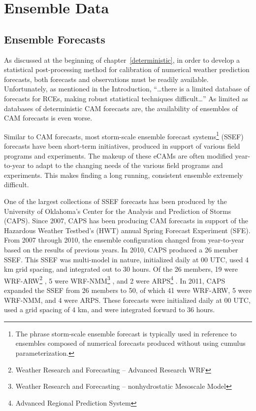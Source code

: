 

\section{Ensemble Data}
\label{edata}




\subsection{Ensemble Forecasts}
\label{emodel}

As discussed at the beginning of \mbox{chapter \ref{deterministic}}, in order to develop a statistical post-processing method for calibration of numerical weather prediction forecasts, both forecasts and observations must be readily available.
Unfortunately, as mentioned in the Introduction, ``\dots there is a limited database of forecasts for RCEs, making robust statistical techniques difficult\dots''
As limited as databases of deterministic CAM forecasts are, the availability of ensembles of CAM forecasts is even worse.


Similar to CAM forecasts, most storm-scale ensemble forecast systems\footnote{The phrase storm-scale ensemble forecast is typically used in reference to ensembles composed of numerical forecasts produced without using cumulus parameterization.} (SSEF) forecasts have been short-term initiatives, produced in support of various field programs and experiments.
The makeup of these eCAMs are often modified year-to-year to adapt to the changing needs of the various field programs and experiments.
This makes finding a long running, consistent ensemble extremely difficult.


One of the largest collections of SSEF forecasts has been produced by the University of Oklahoma's Center for the Analysis and Prediction of Storms (CAPS).
Since 2007, CAPS has been producing CAM forecasts in support of the Hazardous Weather Testbed's (HWT) annual Spring Forecast Experiment (SFE).
From 2007 through 2010, the ensemble configuration changed from year-to-year based on the results of previous years.
In 2010, CAPS produced a 26 member SSEF.
This SSEF was multi-model in nature, initialized daily at 00 UTC, used 4 km grid spacing, and integrated out to 30 hours.
Of the 26 members, 19 were WRF-ARW\footnote{Weather Research and Forecasting -- Advanced Research WRF} \citep{WRFV3}, 5 were WRF-NMM\footnote{Weather Research and Forecasting -- nonhydrostatic Mesoscale Model} \citep{NAMnWRF-NMM}, and 2 were ARPS\footnote{Advanced Regional Prediction System} \citep{ARPS}.
In 2011, CAPS expanded the SSEF from 26 members to 50, of which 41 were WRF-ARW, 5 were WRF-NMM, and 4 were ARPS.
These forecasts were initialized daily at 00 UTC, used a grid spacing of 4 km, and were integrated forward to 36 hours.



